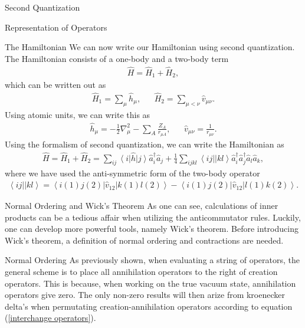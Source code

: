 \documentclass[twoside,english]{uiofysmaster}
\begin{document}
\begin{chapter}{Second Quantization}
\begin{section}{Representation of Operators}
		\begin{subsection}{The Hamiltonian}
			We can now write our Hamiltonian using second quantization. The Hamiltonian consists of a one-body and a two-body term
			\begin{align}
				\hat H = \hat H_1 + \hat H_2,
			\end{align}
			which can be written out as
			\begin{align}
				\hat H_1 = \sum_\mu \hat h_\mu, \:\;\;\;\;\; \hat H_2 = \sum_{\mu < \nu} \hat v_{\mu \nu}.
			\end{align}
			Using atomic units, we can write this as
			\begin{align}
				\hat h_\mu = -\frac{1}{2}\nabla_\mu^2 - \sum_A \frac{Z_A}{r_{\mu A}}, \:\;\;\;\;\; \hat v_{\mu \nu} = \frac{1}{r_{\mu \nu}}.
			\end{align}
			Using the formalism of second quantization, we can write the Hamiltonian as
			\begin{align}
				\hat H = \hat H_1 + \hat H_2 = \sum_{ij} \left<i \right| \hat h \left| j \right> \hat a_i^\dagger \hat a_j 
						+ \frac{1}{4} \sum_{ijkl} \left<ij|| kl \right> \hat a_i^\dagger \hat a_j^\dagger \hat a_l \hat a_k,
			\end{align}
			where we have used the anti-symmetric form of the two-body operator
			\begin{align}
				\left<ij|| kl \right> = \left< i(1) j(2) \right| \hat v_{12} \left| k(1) l(2) \right> - \left< i(1) j(2) \right| \hat v_{12} \left| l(1) k(2) \right>.
			\end{align}
		\end{subsection}

	\end{section}

	\begin{section}{Normal Ordering and Wick's Theorem}
		As one can see, calculations of inner products can be a tedious affair when utilizing the anticommutator rules. Luckily, one can develop more powerful tools, namely Wick's theorem. Before introducing Wick's theorem, a definition of normal ordering and contractions are needed.
		\begin{subsection}{Normal Ordering}
			As previously shown, when evaluating a string of operators, the general scheme is to place all annihilation operators to the right of creation operators. This is because, when working on the true vacuum state, annihilation operators give zero. The only non-zero results will then arize from kroenecker delta's when permutating creation-annihilation operators according to equation (\ref{interchange operators}). 


\end{subsection}
\end{section}
\end{chapter}
\end{document}
